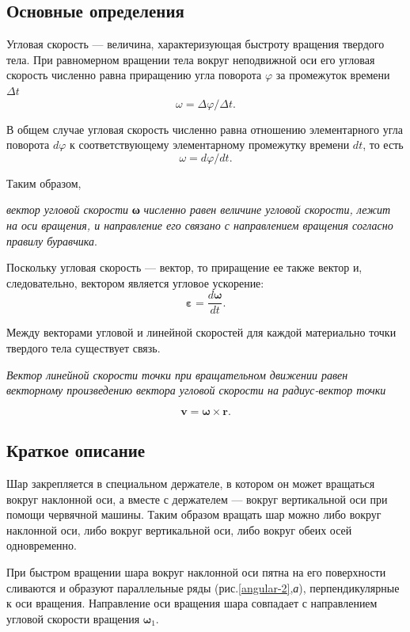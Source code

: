 \documentclass[../../All.tex]{subfiles}
\begin{document}
\subsection*{\textcolor{PineGreen}{Основные определения}}

Угловая скорость — величина, характеризующая быстроту вращения твердого тела. 
При равномерном вращении тела вокруг неподвижной оси его угловая скорость численно равна приращению угла поворота $ \varphi $ за промежуток времени $ \Delta t $
$$ \omega = \Delta \varphi/ \Delta t. $$
 
В общем случае угловая скорость численно равна отношению элементарного угла поворота $d\varphi $ 
к соответствующему элементарному промежутку времени $ dt $, то есть $$ \omega = d\varphi/dt. $$ 

Таким образом,
\begin{flushleft}
	\textit{вектор угловой скорости} \textbf{ω} \textit{численно равен величине угловой скорости, лежит на оси вращения, и направление его связано с направлением вращения согласно правилу буравчика}.
\end{flushleft}

Поскольку угловая скорость — вектор, то приращение ее также вектор и, следовательно, вектором является угловое ускорение:
$$ \textbf{ε} = \frac{d\textbf{ω}}{dt}.$$

Между векторами угловой и линейной скоростей для каждой материально точки твердого тела существует связь.
\begin{flushleft}
	\textit{Вектор линейной скорости точки при вращательном движении равен векторному произведению вектора угловой скорости на радиус-вектор точки}
\end{flushleft}
$$ \textbf{v} = \textbf{ω}\times \textbf{r}. $$

\subsection*{\textcolor{PineGreen}{Краткое описание}}

Шар закрепляется в специальном держателе, в котором он может вращаться вокруг наклонной оси, а вместе с держателем — вокруг вертикальной оси при помощи червячной машины.
Таким образом вращать шар можно либо вокруг наклонной оси, либо вокруг вертикальной оси, либо вокруг обеих осей одновременно.

При быстром вращении шара вокруг наклонной оси пятна на его поверхности сливаются и образуют параллельные ряды (рис.\ref{angular-2},\textit{а}), перпендикулярные к оси вращения.
Направление оси вращения шара совпадает с направлением угловой скорости вращения $ \textbf{ω}_{1} $.
\end{document}
